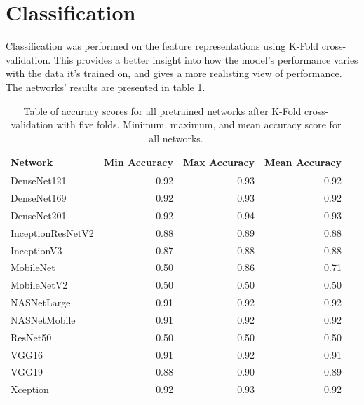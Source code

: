\documentclass[12pt, notitlepage]{article}
\begin{document}
\section{Classification}
Classification was performed on the feature representations using K-Fold cross-validation.
This provides a better insight into how the model's performance varies with the data it's
trained on, and gives a more realisting view of performance.
The networks' results are presented in table \ref{tab:accuracies}.

\begin{table}[h]
    \begin{tabular}{l|r|r|r}
	Network           & Min Accuracy & Max Accuracy & Mean Accuracy \\
	\hline
	DenseNet121       & 0.92         & 0.93         & 0.92          \\
	DenseNet169       & 0.92         & 0.93         & 0.92          \\
	DenseNet201       & 0.92         & 0.94         & 0.93          \\
	InceptionResNetV2 & 0.88         & 0.89         & 0.88          \\
	InceptionV3       & 0.87         & 0.88         & 0.88          \\
	MobileNet         & 0.50         & 0.86         & 0.71          \\
	MobileNetV2       & 0.50         & 0.50         & 0.50          \\
	NASNetLarge       & 0.91         & 0.92         & 0.92          \\
	NASNetMobile      & 0.91         & 0.92         & 0.92          \\
	ResNet50          & 0.50         & 0.50         & 0.50          \\
	VGG16             & 0.91         & 0.92         & 0.91          \\
	VGG19             & 0.88         & 0.90         & 0.89          \\
	Xception          & 0.92         & 0.93         & 0.92         
    \end{tabular}
    \caption{Table of accuracy scores for all pretrained networks after K-Fold cross-validation
    with five folds. Minimum, maximum, and mean accuracy score for all networks.}
    \label{tab:accuracies}
\end{table}
\end{document}
